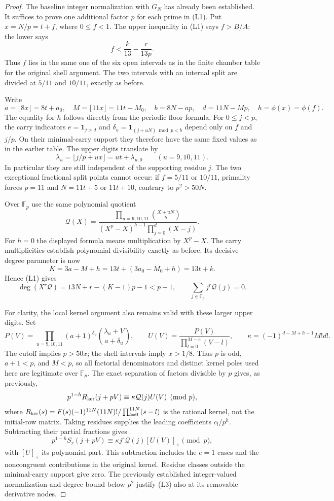 \documentclass[11pt]{article}
\begin{document}
\begin{proof}
The baseline integer normalization with $G_N$ has already been established.
It suffices to prove one additional factor $p$ for each prime in (L1).
Put $x=N/p=t+f$, where $0\le f<1$. The upper inequality in (L1) says
$f>B/A$; the lower says
\[
 f<\frac{k}{13}-\frac{r}{13p}.
\]
Thus $f$ lies in the same one of the six open intervals as in the
finite chamber table for the original shell argument.
The two intervals with an internal split are divided at $5/11$ and
$10/11$, exactly as before.

Write
\[
 a=\lfloor8x\rfloor=8t+a_0,\quad
 M=\lfloor11x\rfloor=11t+M_0,\quad
 b=8N-ap,\quad d=11N-Mp,\quad h=\phi(x)=\phi(f).
\]
The equality for $h$ follows directly from the periodic floor formula.
For $0\le j<p$, the carry indicators $e=\mathbf1_{j>d}$ and
$\delta_u=\mathbf1_{(j+uN)\bmod p<b}$ depend only on $f$ and $j/p$.
On their minimal-carry support they therefore have the same fixed
values as in the earlier table. The upper digits translate by
\[
 \lambda_u=\lfloor j/p+ux\rfloor=ut+\lambda_{u,0}
 \qquad (u=9,10,11).
\]
In particular they are still independent of the supporting residue $j$.
The two exceptional fractional split points cannot occur: if
$f=5/11$ or $10/11$, primality forces $p=11$ and
$N=11t+5$ or $11t+10$, contrary to $p^2>50N$.

Over $\mathbb F_p$ use the same polynomial quotient
\[
 \mathcal Q(X)=
 \frac{\prod_{u=9,10,11}\binom{X+uN}{b}}
 {(X^p-X)^{h-1}\prod_{j=0}^d(X-j)}.
\]
For $h=0$ the displayed formula means multiplication by $X^p-X$.
The carry multiplicities establish polynomial divisibility exactly as
before. Its decisive degree parameter is now
\[
 K=3a-M+h=13t+(3a_0-M_0+h)=13t+k.
\]
Hence (L1) gives
\[
 \deg(X^r\mathcal Q)=13N+r-(K-1)p-1<p-1,
 \qquad \sum_{j\in\mathbb F_p}j^r\mathcal Q(j)=0.
 \tag{L2}
\]

For clarity, the local kernel argument also remains valid with these
larger upper digits. Set
\[
 P(V)=\prod_{u=9,10,11}(a+1)^{\delta_u}
              \binom{\lambda_u+V}{a+\delta_u},\qquad
 U(V)=\frac{P(V)}{\prod_{l=0}^{M-e}(V-l)},\qquad
 \kappa=(-1)^{d-M+h-1}M!d!.
\]
The cutoff implies $p>50x$; the shell intervals imply $x>1/8$.
Thus $p$ is odd, $a+1<p$, and $M<p$, so all factorial denominators
and distinct kernel poles used here are legitimate over $\mathbb F_p$.
The exact separation of factors divisible by $p$ gives, as previously,
\[
 p^{1-h}R_{\rm ker}(j+pV)
       \equiv\kappa\mathcal Q(j)U(V)\pmod p,
\]
where $R_{\rm ker}(s)=F(s)(-1)^{11N}(11N)!/
\prod_{l=0}^{11N}(s-l)$ is the rational kernel, not the initial-row matrix.
Taking residues supplies the leading coefficients $c_l/p^h$.
Subtracting their partial fractions gives
\[
 p^{1-h}S_r(j+pV)
       \equiv\kappa j^r\mathcal Q(j)[U(V)]_+\pmod p,
 \tag{L3}
\]
with $[U]_+$ its polynomial part. This subtraction includes the
$e=1$ cases and the noncongruent contributions in the original
kernel. Residue classes outside the minimal-carry support give zero.
The previously established integer-valued normalization and degree
bound below $p^2$ justify (L3) also at its removable derivative nodes.


\end{proof}
\end{document}
